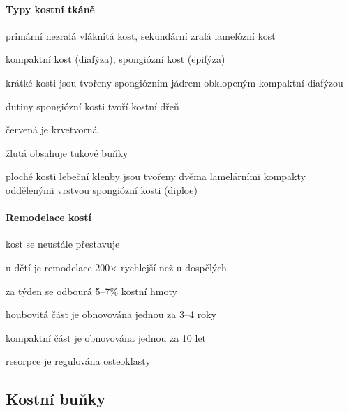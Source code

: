 \documentclass[DIV=8]{scrreprt}
\begin{document}
\paragraph{Typy kostní tkáně}
\begin{myItemize}[nosep]
    \item primární nezralá vláknitá kost, sekundární zralá lamelózní kost
    \item kompaktní kost (diafýza), spongiózní kost (epifýza)
    \item krátké kosti jsou tvořeny spongiózním jádrem obklopeným kompaktní diafýzou
\begin{myItemize}[nosep]
    \item dutiny spongiózní kosti tvoří kostní dřeň
\begin{myItemize}[nosep]
    \item červená je krvetvorná
    \item žlutá obsahuje tukové buňky
\end{myItemize}

\end{myItemize}

    \item ploché kosti lebeční klenby jsou tvořeny dvěma lamelárními kompakty oddělenými vrstvou spongiózní kosti (diploe)
\end{myItemize}




\paragraph{Remodelace kostí}
\begin{myItemize}[nosep]
    \item kost se neustále přestavuje
    \item u dětí je remodelace 200\(\times\) rychlejší než u dospělých
    \item za týden se odbourá 5--7\% kostní hmoty
    \item houbovitá část je obnovována jednou za 3--4 roky
    \item kompaktní část je obnovována jednou za 10 let
    \item resorpce je regulována osteoklasty
\end{myItemize}



\subsection{Kostní buňky} \label{Kostní buňky}
\end{document}

